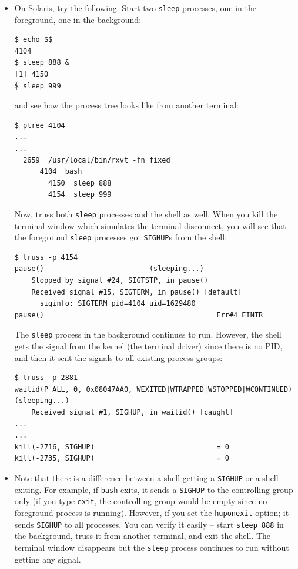 \begin{itemize}
\item On Solaris, try the following. Start two \texttt{sleep} processes, one in
the foreground, one in the background:

\begin{verbatim}
$ echo $$
4104
$ sleep 888 &
[1] 4150
$ sleep 999
\end{verbatim}

and see how the process tree looks like from another terminal:

\begin{verbatim}
$ ptree 4104
...
...
  2659  /usr/local/bin/rxvt -fn fixed
      4104  bash
        4150  sleep 888
        4154  sleep 999
\end{verbatim}

Now, truss both \texttt{sleep} processes and the shell as well. When you kill
the terminal window which simulates the terminal disconnect, you will see that
the foreground \texttt{sleep} processes got \texttt{SIGHUP}s from the shell:

\begin{verbatim}
$ truss -p 4154
pause()                         (sleeping...)
    Stopped by signal #24, SIGTSTP, in pause()
    Received signal #15, SIGTERM, in pause() [default]
      siginfo: SIGTERM pid=4104 uid=1629480
pause()                                         Err#4 EINTR
\end{verbatim}

The \texttt{sleep} process in the background continues to run.
However, the shell gets the signal from the kernel (the terminal driver) since
there is no PID, and then it sent the signals to all existing process groups:

\begin{verbatim}
$ truss -p 2881
waitid(P_ALL, 0, 0x08047AA0, WEXITED|WTRAPPED|WSTOPPED|WCONTINUED) (sleeping...)
    Received signal #1, SIGHUP, in waitid() [caught]
...
...
kill(-2716, SIGHUP)                             = 0
kill(-2735, SIGHUP)                             = 0
\end{verbatim}

\item Note that there is a difference between a shell getting a \texttt{SIGHUP}
or a shell exiting. For example, if \texttt{bash} exits, it sends a
\texttt{SIGHUP} to the controlling group only (if you type \texttt{exit}, the
controlling group would be empty since no foreground process is running).
However, if you set the \texttt{huponexit} option; it sends \texttt{SIGHUP} to
all processes. You can verify it easily -- start \texttt{sleep 888} in the
background, truss it from another terminal, and exit the shell. The terminal
window disappears but the \texttt{sleep} process continues to run without
getting any signal.


\end{itemize}
